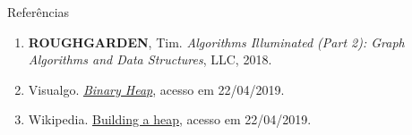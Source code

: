 \begin{frame}[fragile]{Referências}

    \begin{enumerate}
        \item \textbf{ROUGHGARDEN}, Tim. \textit{Algorithms Illuminated (Part 2): Graph Algorithms and Data Structures}, LLC, 2018.

        \item Visualgo. \href{https://visualgo.net/en}{\textit{Binary Heap}}, acesso em 22/04/2019.

        \item Wikipedia. \href{https://en.wikipedia.org/wiki/Binary\_heap#Building\_a\_heap}{Building a heap}, acesso em 22/04/2019.
    \end{enumerate}

\end{frame}
